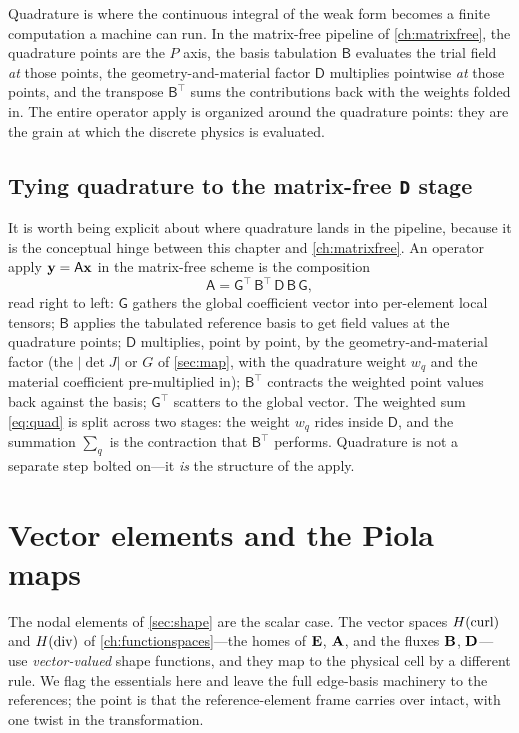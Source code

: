 \begin{physicsbox}
Quadrature is where the continuous integral of the weak form becomes a finite
computation a machine can run. In the matrix-free pipeline of \cref{ch:matrixfree},
the quadrature points are the $P$ axis, the basis tabulation $\mathsf{B}$ evaluates
the trial field \emph{at} those points, the geometry-and-material factor $\mathsf{D}$
multiplies pointwise \emph{at} those points, and the transpose $\mathsf{B}^{\!\top}$
sums the contributions back with the weights folded in. The entire operator apply is
organized around the quadrature points: they are the grain at which the discrete
physics is evaluated.
\end{physicsbox}

\subsection{Tying quadrature to the matrix-free \texttt{D} stage}

It is worth being explicit about where quadrature lands in the pipeline, because it
is the conceptual hinge between this chapter and \cref{ch:matrixfree}. An operator
apply $\mathbf{y} = \mathsf{A}\mathbf{x}$ in the matrix-free scheme is the composition
\[
  \mathsf{A} = \mathsf{G}^{\!\top}\,\mathsf{B}^{\!\top}\,\mathsf{D}\,\mathsf{B}\,\mathsf{G},
\]
read right to left: $\mathsf{G}$ gathers the global coefficient vector into
per-element local tensors; $\mathsf{B}$ applies the tabulated reference basis to get
field values at the quadrature points; $\mathsf{D}$ multiplies, point by point, by the
geometry-and-material factor (the $|\det J|$ or $G$ of \cref{sec:map}, with the
quadrature weight $w_q$ and the material coefficient pre-multiplied in); $\mathsf{B}^{\!\top}$
contracts the weighted point values back against the basis; $\mathsf{G}^{\!\top}$
scatters to the global vector. The weighted sum \eqref{eq:quad} is split across two
stages: the weight $w_q$ rides inside $\mathsf{D}$, and the summation $\sum_q$ is the
contraction that $\mathsf{B}^{\!\top}$ performs. Quadrature is not a separate step
bolted on---it \emph{is} the structure of the apply.

\section{Vector elements and the Piola maps}
\label{sec:vector}

The nodal elements of \cref{sec:shape} are the scalar case. The vector spaces
$H(\mathrm{curl})$ and $H(\mathrm{div})$ of \cref{ch:functionspaces}---the homes of $\mathbf{E}$, $\mathbf{A}$, and the
fluxes $\mathbf{B}$, $\mathbf{D}$---use \emph{vector-valued} shape functions, and they map to the
physical cell by a different rule. We flag the essentials here and leave the full
edge-basis machinery to the references; the point is that the reference-element frame
carries over intact, with one twist in the transformation.

